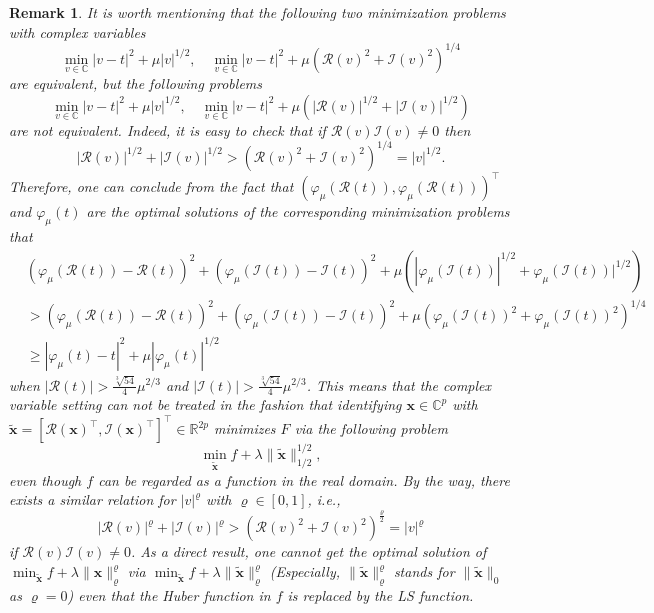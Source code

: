 \documentclass{article}
\newtheorem{remark}{Remark}
\numberwithin{equation}{section}
\begin{document}
\begin{remark}\label{equi-half}
		It is worth mentioning that the following two minimization problems with complex variables 
		$$\min_{v\in\mathbb{C}}|v-t|^2+\mu|v|^{1/2}, \quad \min_{v\in\mathbb{C}}|v-t|^2
		+\mu(\mathcal{R}(v)^2+\mathcal{I}(v)^2)^{1/4}$$
		are equivalent, but the following problems
		$$\min_{v\in\mathbb{C}}|v-t|^2+\mu|v|^{1/2}, \quad \min_{v\in\mathbb{C}}|v-t|^2+\mu(|\mathcal{R}(v)|^{1/2}+|\mathcal{I}(v)|^{1/2})$$
		are not equivalent.
		Indeed, it is easy to check that if $\mathcal{R}(v)\mathcal{I}(v)\neq0$ then
		$$|\mathcal{R}(v)|^{1/2}+|\mathcal{I}(v)|^{1/2}>(\mathcal{R}(v)^2+\mathcal{I}(v)^2)^{1/4}=|v|^{1/2}.$$
		Therefore, one can conclude from the fact that $(\varphi_\mu(\mathcal{R}(t)),\varphi_\mu(\mathcal{R}(t)))^\top$ and
		$\varphi_\mu(t)$ are the optimal solutions of the corresponding minimization problems that
		$$\begin{aligned}&(\varphi_\mu(\mathcal{R}(t))-\mathcal{R}(t))^2+(\varphi_\mu(\mathcal{I}(t))-\mathcal{I}(t))^2+
			\mu(|\varphi_\mu(\mathcal{I}(t))|^{1/2}+\varphi_\mu(\mathcal{I}(t))|^{1/2})\\
			&>(\varphi_\mu(\mathcal{R}(t))-\mathcal{R}(t))^2+(\varphi_\mu(\mathcal{I}(t))-\mathcal{I}(t))^2+
			\mu(\varphi_\mu(\mathcal{I}(t))^2+\varphi_\mu(\mathcal{I}(t))^2)^{1/4}\\
			&\geq |\varphi_\mu(t)-t|^2+\mu|\varphi_\mu(t)|^{1/2}
		\end{aligned}$$
		when $|\mathcal{R}(t)|>\frac{\sqrt[3]{54}}{4}\mu^{2/3}$ and $|\mathcal{I}(t)|>\frac{\sqrt[3]{54}}{4}\mu^{2/3}$.
		This means that the
		complex variable setting can not be treated in the fashion that identifying $\mathbf{x}\in\mathbb{C}^p$ with $\tilde{\mathbf{x}}=[\mathcal{R}(\mathbf{x})^\top, \mathcal{I}(\mathbf{x})^\top]^\top\in\mathbb{R}^{2p}$ minimizes $F$ via the following problem
		$$\min_{\tilde{\mathbf{x}}}f+\lambda\|\tilde{\mathbf{x}}\|_{1/2}^{1/2},$$
		even though $f$ can be regarded as a function in the real domain. By the way, there exists a similar relation for $|v|^\varrho$ with $\varrho\in[0,1]$, i.e., $$|\mathcal{R}(v)|^{\varrho}+|\mathcal{I}(v)|^{\varrho}>(\mathcal{R}(v)^2+\mathcal{I}(v)^2)^{\frac{\varrho}{2}}=|v|^\varrho$$
		if $\mathcal{R}(v)\mathcal{I}(v)\neq0$. As a direct result, one cannot get the optimal solution of $\min_{\tilde{\mathbf{x}}}f+\lambda\|\mathbf{x}\|_\varrho^\varrho$ via 
		$\min_{\tilde{\mathbf{x}}}f+\lambda\|\tilde{\mathbf{x}}\|_\varrho^\varrho$ (Especially, $\|\tilde{\mathbf{x}}\|_\varrho^\varrho$ stands for $\|\tilde{\mathbf{x}}\|_0$ as $\varrho=0$)
		even that the Huber function in $f$ is replaced by the LS function.
\end{remark}
\end{document}
